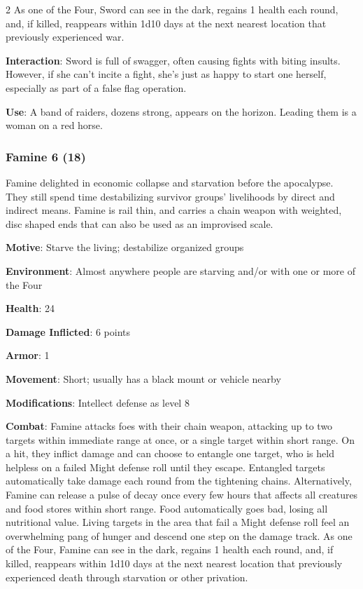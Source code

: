\begin{multicols}{2}
As one of the Four, Sword can see in the dark, regains 1 health each round, and, if killed, reappears within 1d10 days at the next nearest location that previously experienced war. 

\textbf{Interaction}: Sword is full of swagger, often causing fights with biting insults. However, if she can’t incite a fight, she’s just as happy to start one herself, especially as part of a false flag operation. 

\textbf{Use}: A band of raiders, dozens strong, appears on the horizon. Leading them is a woman on a red horse.

\subsubsection{Famine 6 (18)}

Famine delighted in economic collapse and starvation before the apocalypse. They still spend time destabilizing survivor groups’ livelihoods by direct and indirect means. Famine is rail thin, and carries a chain weapon with weighted, disc shaped ends that can also be used as an improvised scale.

\textbf{Motive}: Starve the living; destabilize organized groups

\textbf{Environment}: Almost anywhere people are starving and/or with one or more of the Four

\textbf{Health}: 24

\textbf{Damage Inflicted}: 6 points

\textbf{Armor}: 1

\textbf{Movement}: Short; usually has a black mount or vehicle nearby

\textbf{Modifications}: Intellect defense as level 8

\textbf{Combat}: Famine attacks foes with their chain weapon, attacking up to two targets within immediate range at once, or a single target within short range. On a hit, they inflict damage and can choose to entangle one target, who is held helpless on a failed Might defense roll until they escape. Entangled targets automatically take damage each round from the tightening chains. Alternatively, Famine can release a pulse of decay once every few hours that affects all creatures and food stores within short range. Food automatically goes bad, losing all nutritional value. Living targets in the area that fail a Might defense roll feel an overwhelming pang of hunger and descend one step on the damage track. As one of the Four, Famine can see in the dark, regains 1 health each round, and, if killed, reappears within 1d10 days at the next nearest location that previously experienced death through starvation or other privation. 


\end{multicols}
